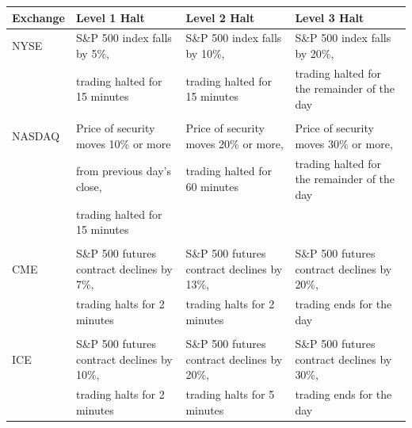 \documentclass[11pt]{article}
\begin{document}
\begin{center}
\begin{tabular}{llll}
\hline
Exchange & Level 1 Halt & Level 2 Halt & Level 3 Halt\\[0pt]
\hline
NYSE & S\&P 500 index falls by 5\%, & S\&P 500 index falls by 10\%, & S\&P 500 index falls by 20\%,\\[0pt]
 & trading halted for 15 minutes & trading halted for 15 minutes & trading halted for the remainder of the day\\[0pt]
 &  &  & \\[0pt]
NASDAQ & Price of security moves 10\% or more & Price of security moves 20\% or more, & Price of security moves 30\% or more,\\[0pt]
 & from previous day's close, & trading halted for 60 minutes & trading halted for the remainder of the day\\[0pt]
 & trading halted for 15 minutes &  & \\[0pt]
 &  &  & \\[0pt]
CME & S\&P 500 futures contract declines by 7\%, & S\&P 500 futures contract declines by 13\%, & S\&P 500 futures contract declines by 20\%,\\[0pt]
 & trading halts for 2 minutes & trading halts for 2 minutes & trading ends for the day\\[0pt]
 &  &  & \\[0pt]
ICE & S\&P 500 futures contract declines by 10\%, & S\&P 500 futures contract declines by 20\%, & S\&P 500 futures contract declines by 30\%,\\[0pt]
 & trading halts for 2 minutes & trading halts for 5 minutes & trading ends for the day\\[0pt]
\hline
\end{tabular}
\end{center}
\end{document}

